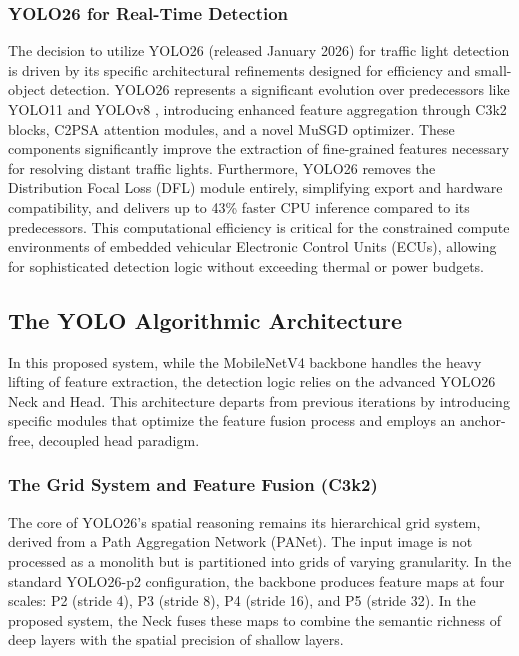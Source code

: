 \subsubsection{YOLO26 for Real-Time Detection}
The decision to utilize YOLO26 (released January 2026) for traffic light detection is driven by its specific architectural refinements designed for efficiency and small-object detection. YOLO26 represents a significant evolution over predecessors like YOLO11 and YOLOv8 \cite{yolo26}, introducing enhanced feature aggregation through C3k2 blocks, C2PSA attention modules, and a novel MuSGD optimizer. These components significantly improve the extraction of fine-grained features necessary for resolving distant traffic lights. Furthermore, YOLO26 removes the Distribution Focal Loss (DFL) module entirely, simplifying export and hardware compatibility, and delivers up to 43\% faster CPU inference compared to its predecessors. This computational efficiency is critical for the constrained compute environments of embedded vehicular Electronic Control Units (ECUs), allowing for sophisticated detection logic without exceeding thermal or power budgets.


\subsection{The YOLO Algorithmic Architecture}
In this proposed system, while the MobileNetV4 backbone handles the heavy lifting of feature extraction, the detection logic relies on the advanced YOLO26 Neck and Head. This architecture departs from previous iterations by introducing specific modules that optimize the feature fusion process and employs an anchor-free, decoupled head paradigm.

\subsubsection{The Grid System and Feature Fusion (C3k2)}

The core of YOLO26's spatial reasoning remains its hierarchical grid system, derived from a Path Aggregation Network (PANet). The input image is not processed as a monolith but is partitioned into grids of varying granularity. In the standard YOLO26-p2 configuration, the backbone produces feature maps at four scales: P2 (stride 4), P3 (stride 8), P4 (stride 16), and P5 (stride 32). In the proposed system, the Neck fuses these maps to combine the semantic richness of deep layers with the spatial precision of shallow layers.

